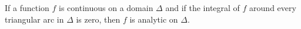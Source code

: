 If a function $f$ is continuous on a domain $\Delta$ and if the integral of $f$ around every triangular arc in $\Delta$ is zero, then $f$ is analytic on $\Delta$.
